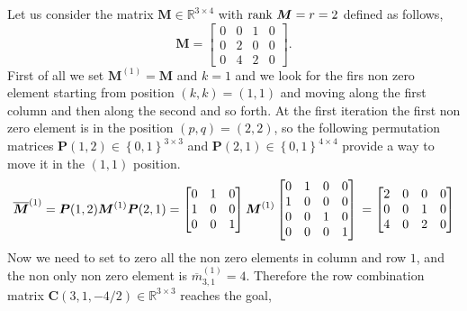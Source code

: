 		\begin{example}
			Let us consider the matrix $\bm{M}\in\mathbb{R}^{3\times 4}$ with $\textnormal{rank}~\bm{M} = r = 2$ defined as follows,
			\begin{equation}
				\bm{M} = 
				\begin{bmatrix}
					0 & 0 & 1 & 0 \\
					0 & 2 & 0 & 0 \\
					0 & 4 & 2 & 0
 				\end{bmatrix}.
			\end{equation}
			First of all we set $\bm{M}^{(1)} = \bm{M}$ and $k=1$ and we look for the firs non zero element starting from position $(k,k) = (1,1)$ and moving along the first column and then along the second and so forth. At the first iteration the first non zero element is in the position $(p,q) = (2,2)$, so the following permutation matrices $\bm{P}(1,2)\in\left\lbrace0,1 \right\rbrace^{3\times 3}$ and $\bm{P}(2,1)\in\left\lbrace 0,1 \right\rbrace^{4\times 4}$ provide a way to move it in the $(1,1)$ position. 
			\begin{equation}
					\overline{\bm{M}}^{(1)} = \bm{P}(1,2)\bm{M}^{(1)}\bm{P}(2,1) = 
					\begin{bmatrix}
						0 & 1 & 0 \\
						1 & 0 & 0 \\
						0 & 0 & 1 \\
					\end{bmatrix}
					\bm{M}^{(1)}
					\begin{bmatrix}
						0 & 1 & 0 & 0 \\
						1 & 0 & 0 & 0 \\
						0 & 0 & 1 & 0 \\
						0 & 0 & 0 & 1
					\end{bmatrix} \\
					=  
					\begin{bmatrix}
						2 & 0 & 0 & 0 \\
						0 & 0 & 1 & 0 \\
						4 & 0 & 2 & 0 \\
					\end{bmatrix}
			\end{equation}
			Now we need to set to zero all the non zero elements in column and row $1$, and the non only non zero element is $\overline{m}_{3,1}^{(1)} = 4$. Therefore the row combination matrix $\bm{C}(3,1,-4/2)\in\mathbb{R}^{3\times 3}$ reaches the goal,
			\begin{equation}
				\begin{split}

\end{split}
\end{equation}
\end{example}
